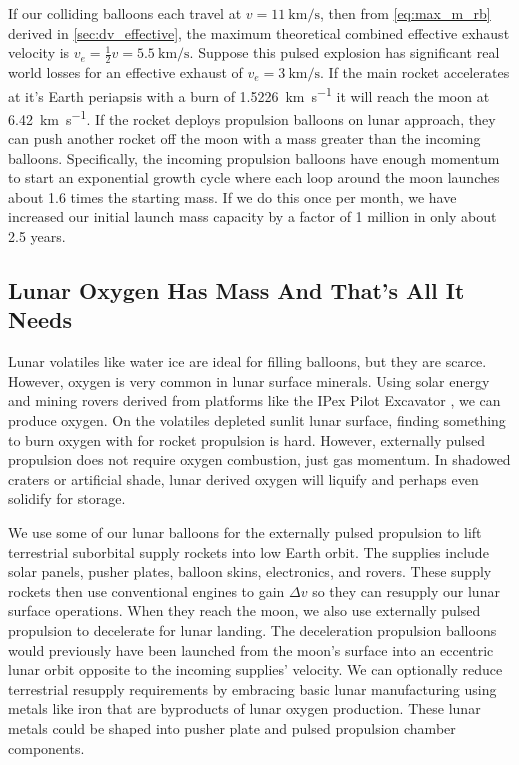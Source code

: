 \documentclass{article}
\begin{document}
{If our colliding balloons each travel at $v=\SI{11}{\kilo\meter\per\second}$, then from \autoref{eq:max_m_rb} derived in \autoref{sec:dv_effective},  the maximum theoretical combined effective exhaust velocity is $v_e = \frac{1}{2}v = \SI {5.5}{\kilo\meter\per\second}$.  Suppose this pulsed explosion has significant real world losses for an effective exhaust of $v_e = \SI{3}{\kilo\meter\per\second}$.   If the main rocket accelerates at it's Earth periapsis with a burn of \SI{1.5226}{\kilo\meter\per\second} it will reach the moon at \SI{6.42}{\kilo\meter\per\second}.   If the rocket deploys propulsion balloons on lunar approach, they can push another rocket off the moon with a mass greater than the incoming balloons. Specifically, the incoming propulsion balloons have enough momentum to start an exponential growth cycle where each loop around the moon launches about 1.6 times the starting mass.   If we do this once per month, we have increased our initial launch mass capacity by a factor of 1 million in only about 2.5 years. 

\subsection{Lunar Oxygen Has Mass And That's All It Needs}\label{sec:lunar_mining}
Lunar volatiles like water ice are ideal for filling balloons, but they are scarce.   However, oxygen is very common in lunar surface minerals.   Using solar energy and mining rovers derived from platforms like the IPex Pilot Excavator \cite{ipex_pilot_excavator}, we can produce oxygen.  On the volatiles depleted sunlit lunar surface, finding something to burn oxygen with for rocket propulsion is hard.   However, externally pulsed propulsion does not require oxygen combustion, just gas momentum.  In shadowed craters or artificial shade, lunar derived oxygen will liquify and perhaps even solidify for storage.  

We use some of our lunar balloons for the externally pulsed propulsion to lift terrestrial suborbital supply rockets into low Earth orbit.  The supplies include solar panels, pusher plates, balloon skins, electronics, and rovers. These supply rockets then use conventional engines to gain \(\Delta v\) so they can resupply our lunar surface operations.   When they reach the moon, we also use externally pulsed propulsion to decelerate for lunar landing.  The deceleration propulsion balloons would previously have been launched from the moon's surface into an eccentric lunar orbit opposite to the incoming supplies' velocity.   We can optionally reduce terrestrial resupply requirements by embracing basic lunar manufacturing using metals like iron that are byproducts of lunar oxygen production.  These lunar metals could be shaped into pusher plate and pulsed propulsion chamber components.  

}
\end{document}
